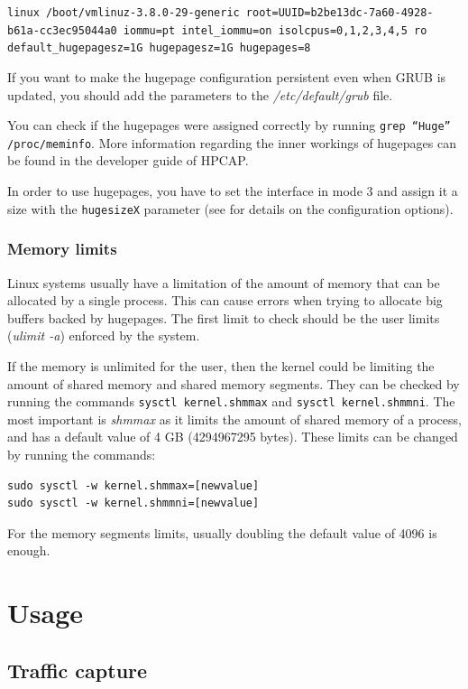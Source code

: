 \documentclass[a4paper,oneside]{hpman}
\begin{document}
\texttt{linux /boot/vmlinuz-3.8.0-29-generic root=UUID=b2be13dc-7a60-4928-b61a-cc3ec95044a0 iommu=pt intel\_iommu=on isolcpus=0,1,2,3,4,5 ro default\_hugepagesz=1G hugepagesz=1G hugepages=8}

If you want to make the hugepage configuration persistent even when GRUB is updated, you should add the parameters to the \textit{/etc/default/grub} file.

You can check if the hugepages were assigned correctly by running \texttt{grep ``Huge'' /proc/meminfo}. More information regarding the inner workings of hugepages can be found in the developer guide of HPCAP.

In order to use hugepages, you have to set the interface in mode 3 and assign it a size with the \texttt{hugesizeX} parameter (see  for details on the configuration options).

\subsection{Memory limits}
\label{sec:Hugepages:Memlimits}

Linux systems usually have a limitation of the amount of memory that can be allocated by a single process. This can cause errors when trying to allocate big buffers backed by hugepages. The first limit to check should be the user limits (\textit{ulimit -a}) enforced by the system.

If the memory is unlimited for the user, then the kernel could be limiting the amount of shared memory and shared memory segments. They can be checked by running the commands \texttt{sysctl kernel.shmmax} and \texttt{sysctl kernel.shmmni}. The most important is \textit{shmmax} as it limits the amount of shared memory of a process, and has a default value of 4 GB (4294967295 bytes). These limits can be changed by running the commands:
\begin{verbatim}
sudo sysctl -w kernel.shmmax=[newvalue]
sudo sysctl -w kernel.shmmni=[newvalue]
\end{verbatim}

For the memory segments limits, usually doubling the default value of 4096 is enough.

\chapter{Usage}
\label{sec:DriverUsage}

\section{Traffic capture}
\label{sec:Capture}
\end{document}
